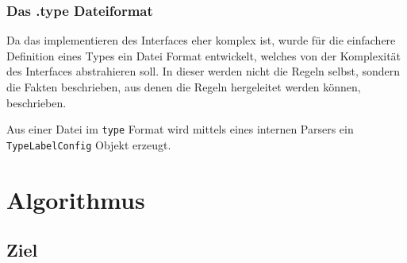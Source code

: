 \subsubsection{Das .type Dateiformat}

Da das implementieren des Interfaces eher komplex ist, wurde für die einfachere 
Definition eines Types ein Datei Format entwickelt, welches von der Komplexität des
Interfaces abstrahieren soll. In dieser werden nicht die Regeln selbst, sondern 
die Fakten beschrieben, aus denen die Regeln hergeleitet werden können, beschrieben.

Aus einer Datei im \texttt{type} Format wird mittels eines internen Parsers ein
\texttt{TypeLabelConfig} Objekt erzeugt. 

\section{Algorithmus}

\subsection{Ziel}